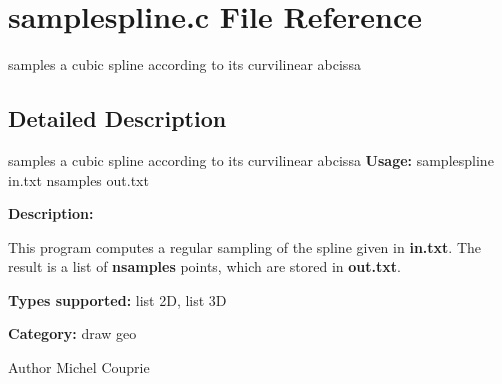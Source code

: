 \section{samplespline.c File Reference}
\label{samplespline_8c}


samples a cubic spline according to its curvilinear abcissa  




\subsection{Detailed Description}
samples a cubic spline according to its curvilinear abcissa {\bfseries Usage:} samplespline in.txt nsamples out.txt

{\bfseries Description:}

This program computes a regular sampling of the spline given in {\bfseries in.txt}. The result is a list of {\bfseries nsamples} points, which are stored in {\bfseries out.txt}.

{\bfseries Types supported:} list 2D, list 3D

{\bfseries Category:} draw geo

\begin{DoxyAuthor}{Author}
Michel Couprie 
\end{DoxyAuthor}
